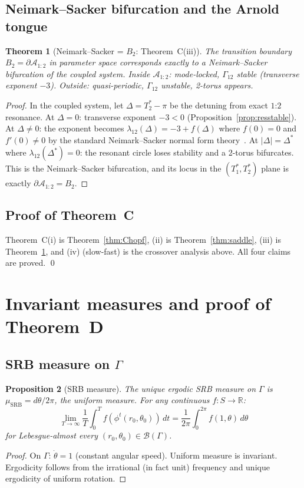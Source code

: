 \documentclass[12pt, oneside]{book}
\theoremstyle{plain}
\newtheorem{theorem}{Theorem}[section]
\newtheorem{proposition}[theorem]{Proposition}
\theoremstyle{definition}
\theoremstyle{remark}
\newcommand{\R}{\mathbb{R}}
\newcommand{\Orb}{\Gamma}
\newcommand{\cB}{\mathcal{B}}
\newcommand{\abs}[1]{\left|#1\right|}
\begin{document}
\subsection{Neimark--Sacker bifurcation and the Arnold tongue}

\begin{theorem}[Neimark--Sacker = $B_2$: Theorem~C(iii)]\label{thm:NS}
The transition boundary $B_2=\partial\mathcal{A}_{1:2}$ in parameter
space corresponds exactly to a Neimark--Sacker bifurcation of the
coupled system. Inside $\mathcal{A}_{1:2}$: mode-locked, $\Orb_{12}$
stable (transverse exponent $-3$). Outside: quasi-periodic, $\Orb_{12}$
unstable, 2-torus appears.
\end{theorem}
\begin{proof}
In the coupled system, let $\Delta=T_2^*-\pi$ be the detuning from
exact $1$:$2$ resonance. At $\Delta=0$: transverse exponent $-3<0$
(Proposition~\ref{prop:resstable}). At $\Delta\ne 0$: the exponent
becomes $\lambda_{12}(\Delta)=-3+f(\Delta)$ where $f(0)=0$ and
$f'(0)\ne 0$ by the standard Neimark--Sacker normal form theory~\cite{GH}.
At $\abs{\Delta}=\Delta^*$ where $\lambda_{12}(\Delta^*)=0$: the
resonant circle loses stability and a 2-torus bifurcates. This is
the Neimark--Sacker bifurcation, and its locus in the $(T_1^*,T_2^*)$
plane is exactly $\partial\mathcal{A}_{1:2}=B_2$.
\end{proof}

\subsection{Proof of Theorem~C}

Theorem~C(i) is Theorem~\ref{thm:Chopf}, (ii) is Theorem~\ref{thm:saddle},
(iii) is Theorem~\ref{thm:NS}, and (iv) (slow-fast) is the crossover
analysis above. All four claims are proved. \qed

\section{Invariant measures and proof of Theorem~D}\label{sec:measures}

\subsection{SRB measure on \texorpdfstring{$\Orb$}{Gamma}}

\begin{proposition}[SRB measure]\label{prop:SRB}
The unique ergodic SRB measure on $\Orb$ is $\mu_{\mathrm{SRB}}=d\theta/2\pi$,
the uniform measure. For any continuous $f\colon S\to\R$:
\[
  \lim_{T\to\infty}\frac{1}{T}\int_0^T f(\phi^t(r_0,\theta_0))\,dt
  = \frac{1}{2\pi}\int_0^{2\pi}f(1,\theta)\,d\theta
\]
for Lebesgue-almost every $(r_0,\theta_0)\in\cB(\Orb)$.
\end{proposition}
\begin{proof}
On $\Orb$: $\dot\theta=1$ (constant angular speed). Uniform measure
is invariant. Ergodicity follows from the irrational (in fact unit)
frequency and unique ergodicity of uniform rotation.
\end{proof}
\end{document}
